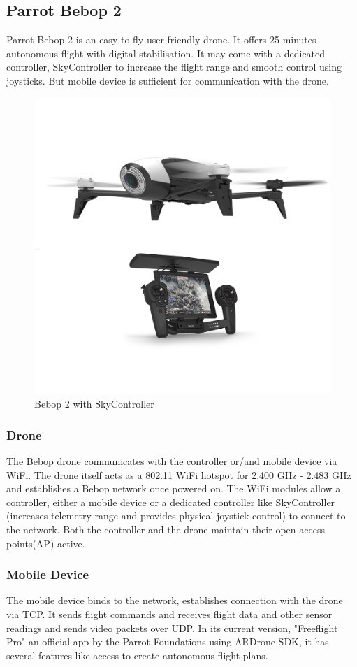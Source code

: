 \documentclass[conference]{IEEEtran}
\begin{document}
\subsection{Parrot Bebop 2}
Parrot Bebop 2 is an easy-to-fly user-friendly drone. It offers 25 minutes autonomous flight with digital stabilisation. It may come with a dedicated controller, SkyController to increase the flight range and smooth control using joysticks. But mobile device is sufficient for communication with the drone.
\begin{figure}[h!]
	\centering
	\includegraphics[height = 0.25\textheight, width=0.8\columnwidth]{parrot}
	\caption{Bebop 2 with SkyController}
\end{figure}

\subsubsection{Drone}
The Bebop drone communicates with the controller or/and mobile device via WiFi. The drone itself acts as a 802.11 WiFi hotspot for 2.400 GHz - 2.483 GHz and establishes a Bebop network once powered on. The WiFi modules allow a controller, either a mobile device or a dedicated controller like SkyController (increases telemetry range and provides physical joystick control) to connect to the network. Both the controller and the drone maintain their open access points(AP) active.

\subsubsection{Mobile Device}
The mobile device binds to the network, establishes connection with the drone via TCP. It sends flight commands and receives flight data and other sensor readings and sends video packets over UDP. In its current version, "Freeflight Pro" an official app by the Parrot Foundations using ARDrone SDK, it has several features like access to create autonomous flight plans.
\end{document}
